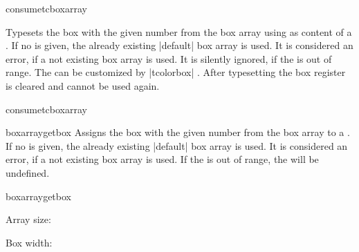 \begin{docCommand}[doc new=2015-07-13]{consumetcboxarray}{}
\begin{articleside}[before skip=5pt]
  Typesets the box with the given  number from the box array 
  using  as content of a .
  If no  is given, the already existing |default| box array is used.
  It is considered an error, if a not existing box array  is used.
  It is silently ignored, if the  is out of range.
  The  can be customized by |tcolorbox| .
  After typesetting the box register is cleared and cannot be used again.
\tcblower{}
\end{articleside}
\begin{exdispExample}{consumetcboxarray}
\begin{tcolorbox}[enhanced jigsaw,size=fbox,width=6cm,
  colback=yellow!10,colframe=yellow!10!black,
  enforce breakable,%
  break at=5cm,
  watermark text=\arabic{tcbbreakpart},
  reset and store to box array
  ]
\lipsum[1]
\end{tcolorbox}

 \hfill {} \hfill {}
\end{exdispExample}
\end{docCommand}


\begin{docCommand}[doc new=2015-07-13]{boxarraygetbox}{}
  Assigns the box with the given  number from the box array 
  to a .
  If no  is given, the already existing |default| box array is used.
  It is considered an error, if a not existing box array  is used.
  If the  is out of range, the  will be undefined.
\begin{exdispExample}{boxarraygetbox}

\boxarraygetsize{\mysize} Array size: \mysize

Box width: \the\wd\mybox
\quad\usebox{\mybox}
\end{exdispExample}
\end{docCommand}


